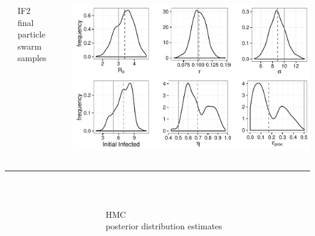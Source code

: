 \documentclass[12pt]{beamer}
\begin{document}
\begin{frame}

	\begin{columns}
		\begin{column}{0.00001\textwidth}
		\null
		\end{column}

		\begin{column}{0.25\textwidth}

			\null
			\large
			IF2 \\
			\vspace{0.5\baselineskip}
			\footnotesize
			final particle swarm samples
			
		\end{column}
		\begin{column}{0.65\textwidth}

			\includegraphics[width=\textwidth,height=0.45\textheight,keepaspectratio=true]{../../writing/SC1/images/if2kernels}

		\end{column}
	\end{columns}
	
	\textcolor{Grey50}{\rule{\textwidth}{0.4pt}} \\

	\begin{columns}
		\begin{column}{0.00001\textwidth}
		\null
		\end{column}

		\begin{column}{0.25\textwidth}

			\null
			\large
			HMC \\
			\vspace{0.5\baselineskip}
			\footnotesize
			posterior distribution estimates \\
			

\end{column}
\end{columns}
\end{frame}
\end{document}
